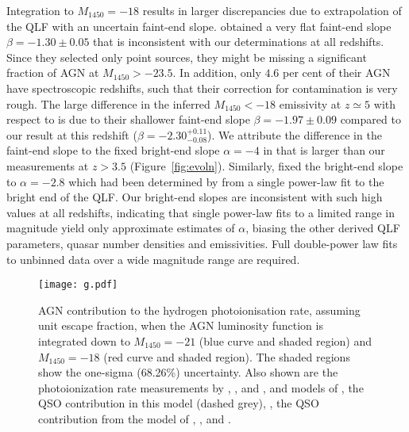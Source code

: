 \documentclass[fleqn,usenatbib]{mnras}
\begin{document}
Integration to $M_{1450}=-18$ results in larger discrepancies due to
extrapolation of the QLF with an uncertain faint-end slope.
\citet{2018PASJ...70S..34A} obtained a very flat faint-end slope
$\beta=-1.30\pm 0.05$ that is inconsistent with our determinations at
all redshifts. Since they selected only point sources, they might be
missing a significant fraction of AGN at $M_{1450}>-23.5$.  In
addition, only $4.6$ per cent of their AGN have spectroscopic
redshifts, such that their correction for contamination is very rough.
The large difference in the inferred $M_{1450}<-18$ emissivity at
$z\simeq 5$ with respect to \citet{2018AJ....155..131M} is due to
their shallower faint-end slope $\beta=-1.97\pm 0.09$ compared to our
result at this redshift ($\beta=-2.30^{+0.11}_{-0.08}$). We attribute
the difference in the faint-end slope to the fixed bright-end slope
$\alpha=-4$ in \citet{2018AJ....155..131M} that is larger than our
measurements at $z>3.5$ (Figure~\ref{fig:evoln}).  Similarly,
\citet{2017ApJ...847L..15O} fixed the bright-end slope to
$\alpha=-2.8$ which had been determined by \citet{2016ApJ...833..222J}
from a single power-law fit to the bright end of the QLF.  Our
bright-end slopes are inconsistent with such high values at all
redshifts, indicating that single power-law fits to a limited range in
magnitude yield only approximate estimates of $\alpha$, biasing the
other derived QLF parameters, quasar number densities and
emissivities.  Full double-power law fits to unbinned data over a wide
magnitude range are required.

\begin{figure*}
  \begin{center}
    \texttt{[image: g.pdf]}
  \end{center}
  \caption{AGN contribution to the hydrogen photoionisation rate,
    assuming unit escape fraction, when the AGN luminosity function is
    integrated down to $M_{1450}=-21$ (blue curve and shaded region)
    and $M_{1450}=-18$ (red curve and shaded region).  The shaded
    regions show the one-sigma (68.26\%) uncertainty.  Also shown are
    the photoionization rate measurements by \citet[filled
      circles]{2013MNRAS.436.1023B}, \citet[inverted
      triangles]{2011MNRAS.412.2543C}, and
    \citet[pentagons]{2017MNRAS.467.3172G}, and models of
    \citet[dotted brown curve]{2012ApJ...746..125H}, the QSO
    contribution in this model (dashed grey), \citet[dashed
      brown]{2015ApJ...813L...8M}, the QSO contribution from the model
    of \citet[dashed orange]{2015MNRAS.451L..30K}, \citet[dotted
      grey]{2017ApJ...837..106O}, and \citet[dashed
      grey]{2018arXiv180104931P}.}
  \label{fig:gammapi}
\end{figure*}
\end{document}
